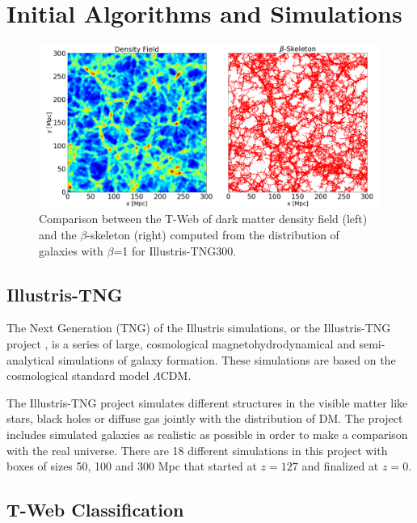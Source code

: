 \documentclass[usenatbib]{mnras}
\begin{document}
\section{Initial Algorithms and Simulations}\label{sec:init}

\begin{figure}
\centering
 \includegraphics[scale=0.28]{Figs/Fig1_.png}%
 \caption{Comparison between the T-Web of dark matter density field (left) and the $\beta$-skeleton (right) computed from the distribution of galaxies with $\beta$=1 for Illustris-TNG300.}
 \label{fig:TWebBsk}
\end{figure}

\subsection{Illustris-TNG}

The Next Generation (TNG) of the Illustris simulations, or the
Illustris-TNG project \citep{Nelson2015},  is a series of large,
cosmological magnetohydrodynamical and semi-analytical simulations of
galaxy formation. 
These simulations are based on the cosmological standard model
$\Lambda$CDM.  

The Illustris-TNG project simulates different structures in the
visible matter like stars, black holes or diffuse gas jointly with the
distribution of DM.   
The project includes simulated galaxies as realistic as possible in
order to make a comparison with the real universe. There are 18
different simulations in this project with boxes of sizes 50, 100 and
300 Mpc that started at $z=127$ and finalized at $z=0$.   

\subsection{T-Web Classification}
\end{document}
